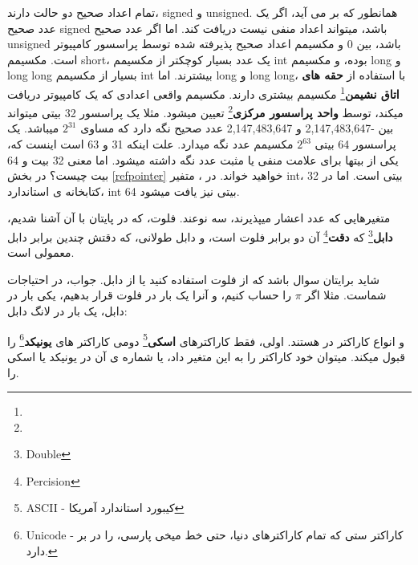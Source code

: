 \documentclass[14pt,a4paper]{memoir}
\begin{document}
	 
	 
	 تمام اعداد صحیح دو حالت دارند، signed و unsigned. همانطور که بر می آید، اگر یک عدد صحیح signed باشد، میتواند اعداد منفی نیست دریافت کند. اما اگر عدد صحیح unsigned باشد، بین 0 و مکسیمم اعداد صحیح پذیرفته شده توسط پراسسور کامپیوتر است. مکسیمم short، یک عدد بسیار کوچکتر از مکسیمم int بوده، و مکسیمم long و long long بسیار از مکسیمم int بیشترند. اما long و long long، با استفاده از \textbf{حقه های اتاق نشیمن}\footnote{} مکسیمم بیشتری دارند. مکسیمم واقعی اعدادی که یک کامپیوتر دریافت میکند، توسط \textbf{واحد پراسسور مرکزی}\footnote{} تعیین میشود. مثلا یک پراسسور 32 بیتی میتواند بین   -2,147,483,647 و 2,147,483,647 عدد صحیح نگه دارد که مساوی $ 2^{31} $ میباشد. یک پراسسور 64 بیتی $ 2^{63} $ مکسیمم عدد نگه میدارد. علت اینکه 31 و 63 است اینست که، یکی از بیتها برای علامت منفی یا مثبت عدد نگه داشته میشود. اما معنی 32 بیت و 64 بیت چیست؟ در بخش \ref{refpointer} خواهید خواند. در ، متفیر int، 32 بیتی است. اما در کتابخانه ی استاندارد، int 64 بیتی نیز یافت میشود.
	 
	 متغیرهایی که عدد اعشار میپذیرند،  سه نوعند. فلوت، که در پایتان با آن آشنا شدیم، \textbf{دابل}\footnote{Double} که \textbf{دقت}\footnote{Percision} آن دو برابر فلوت است، و دابل طولانی، که دقتش چندین برابر دابل معمولی است.
	 
	 \begin{tip}
	 	شاید برایتان سوال باشد که از فلوت استفاده کنید یا از دابل. جواب، در احتیاجات شماست. مثلا اگر $ \pi $ را حساب کنیم، و آنرا یک بار در فلوت قرار بدهیم، یکی بار در دابل، یک بار در لانگ دابل:	 		 	 	 	 \begin{latin}
	 		
	 	\end{latin}
	 \end{tip}
	 
	 
	 
	  و  انواع کاراکتر در  هستند. اولی، فقط کاراکترهای \textbf{اسکی}\footnote{ASCII - کیبورد استاندارد آمریکا} دومی کاراکتر های \textbf{یونیکد}\footnote{Unicode - کاراکتر ستی که تمام کاراکترهای دنیا، حتی خط میخی پارسی، را در بر دارد.} را قبول میکند. میتوان خود کاراکتر را به این متغیر داد، یا شماره ی آن در یونیکد یا اسکی را.
	 
\end{document}
